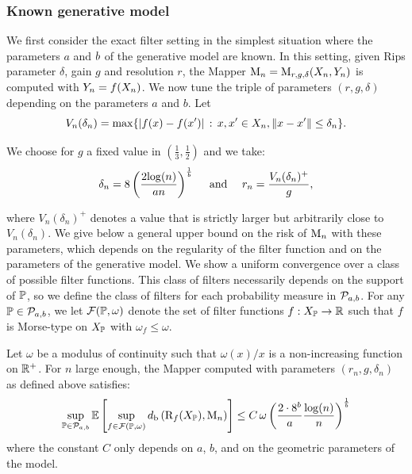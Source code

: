 \subsubsection*{Known generative model}

We first consider the exact filter setting in  the simplest situation where the parameters  
$a$ and $b$ of the generative model are known. In this setting, given Rips parameter $\delta$, 
gain $g$ and resolution $r$, the Mapper $\mathrm{M}_n = \mathrm{M}_{r,g,\delta}(X_n,Y_n)$  
is computed with $Y_n = f(X_n)$.  We now tune the triple of parameters $(r,g,\delta)$ 
depending on the parameters $a$ and $b$.  
Let 
\begin{equation}\label{eq:Vn}
V_n(\delta_n)=\max\{|f(x)-f(x')|\, :\, x,x'\in X_n, \|x-x'\|\leq\delta_n\}.
\end{equation}

We choose for $g$ a fixed value in $\left(\frac13,\frac12\right)$ and we take:
\begin{equation}\label{eq:paramexactknown}
\delta_n=8\left(\frac{2{\log}(n)}{an}\right)^{\frac 1{b}}
\quad 
\textrm{ and }
\quad 
r_n= \frac{V_n(\delta_n)^+} {g},
\end{equation}

where $V_n(\delta_n)^+$ denotes a value that is strictly larger but arbitrarily close to $V_n(\delta_n)$.
We  give below a general upper bound on the risk of $\mathrm{M}_n$ with these parameters, which depends on the regularity 
of the filter function and on the parameters of the generative model.  We show a uniform convergence over a class of possible filter functions. 
This class of filters necessarily depends on the support of $\mathbb{P}$, so we define the class of filters for each probability measure in 
$\mathcal{P}_{a,b}$. For any $\mathbb{P} \in \mathcal{P}_{a,b}$, we let 
$\mathcal F (\mathbb{P},\omega)$ %
denote the set of filter functions 
$f: X_{\mathbb{P}} \rightarrow \mathbb{R}$ such that $f$ is Morse-type on $ X_{\mathbb{P}}$ with $\omega_f \leq \omega$. 

\begin{prop} \label{prop:UpBdRestr}
Let $\omega$ be a   modulus of continuity such that  $\omega(x) / x $ is a non-increasing function on $\mathbb{R}^+$. 
For $n$ large enough, the Mapper computed with parameters $(r_n,g,\delta_n)$ as defined above satisfies:
$$
\sup_{\p \in \mathcal P_{a,b}} \mathbb{E}\left[   \sup_{f \in \mathcal F(\p,\omega) } 
\dper\left(\Reeb_f(\Xset_\p), \Map_n\right)\right] \leq C\,\omega\left(\frac{2\cdot 8^{\dimension}}{a}\frac{{\log}(n)}{n}\right)^{\frac 1\dimension} %
$$
where the constant $C$ only depends on $a$, $b$, and on the geometric parameters of the model.
\end{prop}

